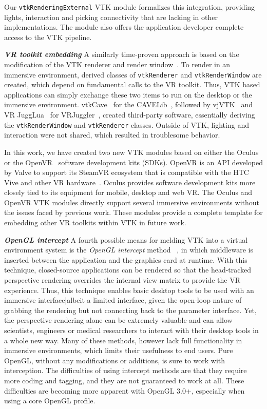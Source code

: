 Our \texttt{vtkRenderingExternal} VTK module formalizes this integration, providing lights, interaction and picking connectivity that are lacking in other implementations. The module also offers the application developer complete access to the VTK pipeline.

\textbf{\textit{VR toolkit embedding}} A similarly time-proven approach is based on the modification of the VTK renderer and render window~\cite{van2000vista, Hannema:2001, Shamonin02vtkcave, Belleman:2003}. 
To render in an immersive environment, derived classes of
\texttt{vtkRenderer} and \texttt{vtkRenderWindow} are created, which depend on fundamental calls to the VR toolkit.
Thus, VTK based applications can simply exchange these two items to run on the desktop or the immersive environment.
vtkCave~\cite{Tufo:1999} for the CAVELib~\cite{CAVELib:2016}, followed by
vjVTK~\cite{Blom:2006} and VR JuggLua~\cite{Pavlik:2012} for
VRJuggler~\cite{Bierbaum:2001}, created third-party software, essentially
deriving the \texttt{vtkRenderWindow} and \texttt{vtkRenderer} classes. Outside of VTK, lighting and interaction were not shared, which resulted in troublesome behavior.

In this work, we have created two new VTK modules based on either the Oculus~\cite{Oculus:2016} or the OpenVR~\cite{OpenVR:2016} software development kits (SDKs).
OpenVR is an API developed by Valve to support its SteamVR ecosystem that is compatible with the HTC Vive and other VR hardware~\cite{Road2VR:2015}. Oculus provides software development kits more closely tied to its equipment for mobile, desktop and web VR. The Oculus and OpenVR VTK modules directly support several immersive environments
without the issues faced by previous work. These modules provide a complete template
for embedding other VR toolkits within VTK in future work.

\textit{\textbf{OpenGL intercept}}
A fourth possible means for melding VTK into a virtual environment system
is the \textit{OpenGL intercept} method
~\cite{Humphreys:2001,Humphreys:2002,Zielinski:2014,TechViz:2016,Conduit:2016}, in which middleware is inserted between the application and the graphics card at runtime.
With this technique, closed-source applications can be rendered so that
the head-tracked perspective rendering overrides the internal view matrix
to provide the VR experience.
Thus, this technique enables basic desktop tools to be used with an
immersive interface|albeit a limited interface, given the open-loop nature of
grabbing the rendering but not connecting back to the parameter interface.
Yet, the perspective rendering alone can be extremely valuable and can allow
scientists, engineers or medical researchers to interact with their desktop
tools in a whole new way. Many of these methods, however lack full functionality in immersive environments, which limits their usefulness to end users.
Pure OpenGL, without any modifications or additions, is sure to work with interception.
The difficulties of using intercept methods are that they require more coding
and tagging, and they are not guaranteed to work at all. These difficulties are becoming
more apparent with OpenGL 3.0+, especially when using a core OpenGL profile.

